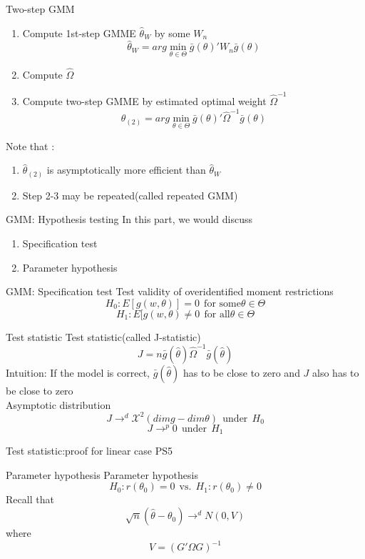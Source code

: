 \documentclass{beamer}
\begin{document}
\begin{frame}{Two-step GMM}
	\begin{enumerate}
		\item Compute 1st-step GMME $\hat{\theta}_W$ by some $W_n$
			\[\hat{\theta}_W = arg \min_{\theta \in \Theta} \bar{g}(\theta)' W_n \bar{g}(\theta)\]
		\item Compute $\hat{\Omega}$
		\item Compute two-step GMME by estimated optimal weight $\hat{\Omega}^{-1}$
			\[\hat{\theta}_{(2)} = arg\min_{\theta \in \Theta} \bar{g}(\theta)'\hat{\Omega}^{-1} \bar{g}(\theta)\]
	\end{enumerate}
	Note that :
	\begin{enumerate}
		\item $\hat{\theta}_{(2)}$ is asymptotically more efficient than $\hat{\theta}_W$
		\item Step 2-3 may be repeated(called repeated GMM)
	\end{enumerate}
\end{frame}
\begin{frame}{GMM: Hypothesis testing}
	In this part, we would discuss
	\begin{enumerate}
			\item Specification test
			\item Parameter hypothesis
	\end{enumerate}
\end{frame}
\begin{frame}{GMM: Specification test}
	Test validity of overidentified moment restrictions 
	\[H_0 : E[g(w,\theta)] = 0 \ \ \text{for some} \theta \in \Theta\]
	\[H_1 : E[g(w,\theta) \neq 0 \ \ \text{for all} \theta \in \Theta\]
\end{frame}
\begin{frame}{Test statistic}
	Test statistic(called J-statistic)
	\[J = n \bar{g}(\hat{\theta}) \hat{\Omega}^{-1} \bar{g}(\hat{\theta})\]
	Intuition: If the model is correct, $\bar{g}(\hat{\theta})$ has to be close to zero and $J$ also has to be close to zero \\
	Asymptotic distribution
	\[J \rightarrow^d \mathcal{X}^2(dim g - dim \theta) \ \ \text{under} \ \ H_0\]
	\[J \rightarrow^p 0 \ \ \text{under} \ \  H_1\]
\end{frame}
\begin{frame}{Test statistic:proof for linear case}
	PS5
\end{frame}
\begin{frame}{Parameter hypothesis}
	Parameter hypothesis 
	\[H_0:r(\theta_0) = 0 \ \ \text{vs.} \ \ H_1: r(\theta_0) \neq 0\]
	Recall that 
	\[\sqrt{n} (\hat{\theta} - \theta_0) \rightarrow^d N(0,V)\]
	where
	\[V = (G' \Omega G)^{-1}\]
\end{frame}
\end{document}
